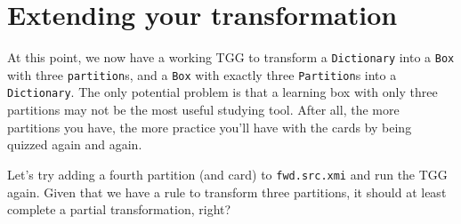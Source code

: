 \newpage
\section{Extending your transformation}
\genHeader

At this point, we now have a working TGG to transform a \texttt{Dictionary} into a \texttt{Box} with three \texttt{partition}s, and a \texttt{Box} with
exactly three \texttt{Partition}s into a \texttt{Dictionary}. The only potential problem is that a learning box with only three partitions may not be the most
useful studying tool. After all, the more partitions you have, the more practice you'll have with the cards by being quizzed again and again.

Let's try adding a fourth partition (and card) to \texttt{fwd.src.xmi} and run the TGG again. Given that we have a rule to transform three partitions, it should
at least complete a partial transformation, right? 

